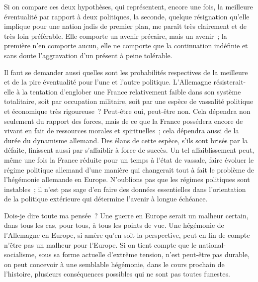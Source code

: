 \documentclass[french,twoside]{book} %
\begin{document}
Si on compare ces deux hypothèses, qui représentent, encore une fois, la meilleure éventualité par rapport à deux politiques, la seconde, quelque rési­gnation qu'elle implique pour une nation jadis de premier plan, me paraît très clairement et de très loin préférable. Elle comporte un avenir précaire, mais un avenir ; la première n'en comporte aucun, elle ne comporte que la continuation indéfinie et sans doute l'aggravation d'un présent à peine tolérable.\par
Il faut se demander aussi quelles sont les probabilités respectives de la meilleure et de la pire éventualité pour l'une et l'autre politique. L'Allemagne résisterait-elle à la tentation d'englober une France relativement faible dans son système totalitaire, soit par occupation militaire, soit par une espèce de vassalité politique et économique très rigoureuse ? Peut-être oui, peut-être non. Cela dépendra non seulement du rapport des forces, mais de ce que la France possédera encore de vivant en fait de ressources morales et spiri­tuelles ; cela dépendra aussi de la durée du dynamisme allemand. Des élans de cette espèce, s'ils sont brisés par la défaite, finissent aussi par s'affaiblir à force de succès. Un tel affaiblissement peut, même une fois la France réduite pour un temps à l'état de vassale, faire évoluer le régime politique allemand d'une manière qui changerait tout à fait le problème de l'hégémonie allemande en Europe. N'oublions pas que les régimes politiques sont instables ; il n'est pas sage d'en faire des données essentielles dans l'orientation de la politique extérieure qui détermine l'avenir à longue échéance.\par
Dois-je dire toute ma pensée ? Une guerre en Europe serait un malheur certain, dans tous les cas, pour tous, à tous les points de vue. Une hégémonie de l'Allemagne en Europe, si amère qu'en soit la perspective, peut en fin de compte n'être pas un malheur pour l'Europe. Si on tient compte que le national-socialisme, sous sa forme actuelle d'extrême tension, n'est peut-être pas durable, on peut concevoir à une semblable hégémonie, dans le cours prochain de l'histoire, plusieurs conséquences possibles qui ne sont pas toutes funestes.\par
\end{document}
